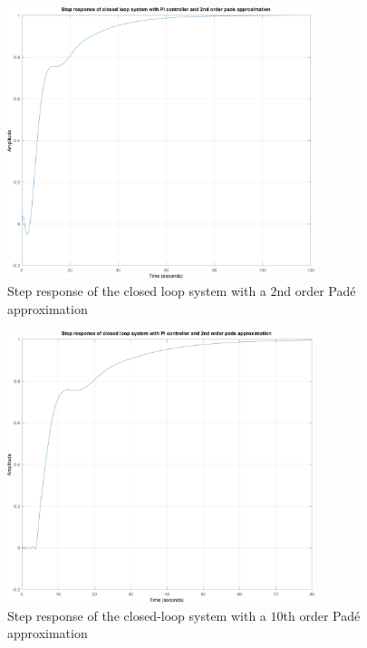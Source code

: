 \begin{figure}[h!]
	\centering
	\includegraphics[width=0.8\textwidth]{Pictures/StepResponse_Pade2.png}
	
	\caption{Step response of the closed loop system with a $2$nd order Padé approximation}
	\label{fig:StepResponse_Pade2}
\end{figure}


\begin{figure}[h!]
	\centering
	\includegraphics[width=0.8\textwidth]{Pictures/StepResponse_Pade10.png}
	
	\caption{Step response of the closed-loop system with a $10$th order Padé approximation}
	\label{fig:StepResponse_Pade10}
\end{figure}